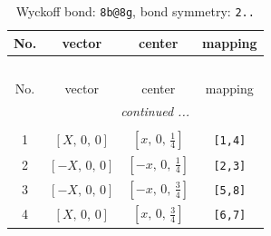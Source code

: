 \documentclass[fleqn,8pt]{jsarticle}
\begin{document}
\renewcommand{\arraystretch}{1.2}
\begin{longtable}{cccc}
\caption{Wyckoff bond: {\tt 8b@8g}, bond symmetry: {\tt 2..}}
 \\
 \hline \hline
No. & vector & center & mapping \\ \hline \endfirsthead

\multicolumn{3}{l}{\tablename\ \thetable{}} \\
 \hline \hline
No. & vector & center & mapping \\ \hline \endhead

 \hline \hline
\multicolumn{3}{r}{\footnotesize\it continued ...} \\ \endfoot

 \hline \hline
\multicolumn{3}{r}{} \\ \endlastfoot

1 & $\left[ X,\, 0,\, 0 \right]$ & $\left[ x,\, 0,\, \frac{1}{4} \right]$ & {\tt [1,4]} \\ \hline
2 & $\left[ - X,\, 0,\, 0 \right]$ & $\left[ - x,\, 0,\, \frac{1}{4} \right]$ & {\tt [2,3]} \\ \hline
3 & $\left[ - X,\, 0,\, 0 \right]$ & $\left[ - x,\, 0,\, \frac{3}{4} \right]$ & {\tt [5,8]} \\ \hline
4 & $\left[ X,\, 0,\, 0 \right]$ & $\left[ x,\, 0,\, \frac{3}{4} \right]$ & {\tt [6,7]} \\
\end{longtable}
\renewcommand{\arraystretch}{1.2}
\end{document}
